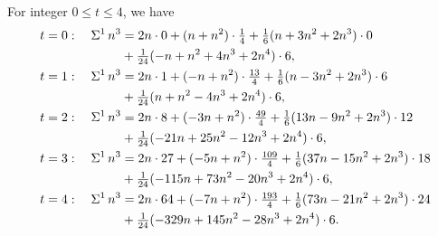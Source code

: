 \begin{example}
  For integer $0 \leq t \leq 4$, we have
  \begin{align*}
    t=0:\quad \Sigma^{1}\,{n}^{3}
    &=
    2n\cdot0
    +(n+n^2)\cdot\tfrac{1}{4}
    +\tfrac{1}{6}(n+3n^2+2n^3)\cdot0 \\
    &+\tfrac{1}{24}(-n+n^2+4n^3+2n^4)\cdot6,
    \\
    t=1:\quad \Sigma^{1}\,{n}^{3}
    &=
    2n\cdot1
    +(-n+n^2)\cdot\tfrac{13}{4}
    +\tfrac{1}{6}(n-3n^2+2n^3)\cdot6 \\
    &+\tfrac{1}{24}(n+n^2-4n^3+2n^4)\cdot6,
    \\
    t=2:\quad \Sigma^{1}\,{n}^{3}
    &=
    2n\cdot8
    +(-3n+n^2)\cdot\tfrac{49}{4}
    +\tfrac{1}{6}(13n-9n^2+2n^3)\cdot12 \\
    &+\tfrac{1}{24}(-21n+25n^2-12n^3+2n^4)\cdot6,
    \\
    t=3:\quad \Sigma^{1}\,{n}^{3}
    &=
    2n\cdot27
    +(-5n+n^2)\cdot\tfrac{109}{4}
    +\tfrac{1}{6}(37n-15n^2+2n^3)\cdot18 \\
    &+\tfrac{1}{24}(-115n+73n^2-20n^3+2n^4)\cdot6,
    \\
    t=4:\quad \Sigma^{1}\,{n}^{3}
    &=
    2n\cdot64
    +(-7n+n^2)\cdot\tfrac{193}{4}
    +\tfrac{1}{6}(73n-21n^2+2n^3)\cdot24 \\
    &+\tfrac{1}{24}(-329n+145n^2-28n^3+2n^4)\cdot6.
  \end{align*}
\end{example}
